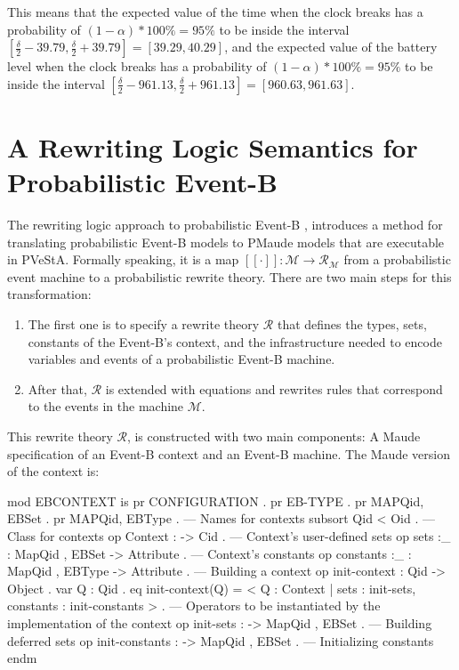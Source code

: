 This means that the expected value of the time when the clock breaks has a probability of $(1-\alpha)*100\% = 95\%$ to be inside the interval $[\frac{\delta}{2} - 39.79, \frac{\delta}{2} + 39.79] = [39.29, 40.29]$, and the expected value of the battery level when the clock breaks has a probability of $(1-\alpha)*100\% = 95\%$ to be inside the interval $[\frac{\delta}{2} - 961.13, \frac{\delta}{2} + 961.13] = [960.63, 961.63]$.


\section{A Rewriting Logic Semantics for Probabilistic Event-B}
The rewriting logic approach to probabilistic Event-B \cite{Olarte}, introduces a method for translating probabilistic Event-B models to PMaude models that are executable in PVeStA. Formally speaking, it is a map $[[ \cdot ]]: \mathscr{M} \rightarrow \mathscr{R}_\mathscr{M}$ from a probabilistic event machine to a probabilistic rewrite theory. There are two main steps for this transformation:

\begin{enumerate}
    \item The first one is to specify a rewrite theory $\mathscr{R}$ that defines the types, sets, constants of the Event-B's context, and the infrastructure needed to encode variables and events of a probabilistic Event-B machine.
    \item After that, $\mathscr{R}$ is extended with equations and rewrites rules that correspond to the events in the machine $\mathscr{M}$.
\end{enumerate}
This rewrite theory $\mathscr{R}$, is constructed with two main components: A Maude specification of an Event-B context and an Event-B machine. The Maude version of the context is:
\\
\begin{maude}
mod EBCONTEXT is 
  pr CONFIGURATION . pr EB-TYPE  . pr MAP{Qid, EBSet} . pr MAP{Qid, EBType} .
  --- Names for contexts
  subsort Qid < Oid .
  --- Class for contexts
  op Context  : -> Cid . 
  --- Context's user-defined sets
  op sets :_      : Map{Qid , EBSet}  -> Attribute .
  --- Context's constants
  op constants :_ : Map{Qid , EBType} -> Attribute .
  --- Building a context
  op init-context : Qid -> Object .                         
  var Q : Qid .
  eq init-context(Q) = < Q : Context | sets : init-sets,
                         constants : init-constants  > .
  --- Operators to be instantiated by the implementation of the context
  op init-sets : ->  Map{Qid , EBSet} . --- Building deferred sets
  op init-constants : ->  Map{Qid , EBSet} . --- Initializing constants 
endm
\end{maude}

